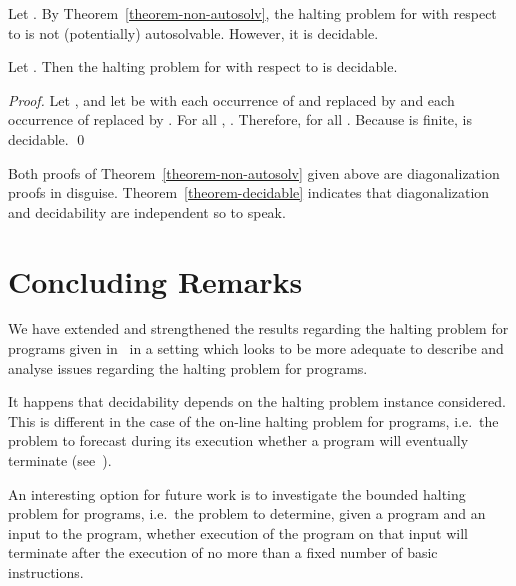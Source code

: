 \documentclass[fleqn]{llncs}
\begin{document}
Let .
By Theorem~\ref{theorem-non-autosolv}, the halting problem for
 with respect to  is not (potentially)
autosolvable.
However, it is decidable.
\begin{theorem}
\label{theorem-decidable}
Let .
Then the halting problem for  with respect to  is
decidable.
\end{theorem}
\begin{proof}
Let , and let  be  with each occurrence of
 and  replaced by  and each occurrence
of  replaced by .
For all , .
Therefore,  for all .
Because  is finite,  is decidable.
\qed
\end{proof}
Both proofs of Theorem~\ref{theorem-non-autosolv} given above are
diagonalization proofs in disguise.
Theorem~\ref{theorem-decidable} indicates that diagonalization and
decidability are independent so to speak.


\section{Concluding Remarks}
\label{sect-concl}

We have extended and strengthened the results regarding the halting
problem for programs given in~\cite{BP04a} in a setting which looks to
be more adequate to describe and analyse issues regarding the halting
problem for programs.

It happens that decidability depends on the halting problem instance
considered.
This is different in the case of the on-line halting problem for
programs, i.e.\ the problem to forecast during its execution whether a
program will eventually terminate (see~\cite{BP04a}).

An interesting option for future work is to investigate the bounded
halting problem for programs, i.e.\ the problem to determine, given a
program and an input to the program, whether execution of the program on
that input will terminate after the execution of no more than a fixed
number of basic instructions.



\end{document}
